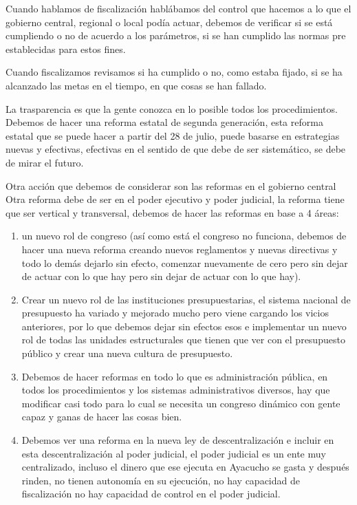 \documentclass[
  letterpaper,
  DIV=11,
  numbers=noendperiod]{scrartcl}
\begin{document}
Cuando hablamos de fiscalización hablábamos del control que hacemos a lo
que el gobierno central, regional o local podía actuar, debemos de
verificar si se está cumpliendo o no de acuerdo a los parámetros, si se
han cumplido las normas pre establecidas para estos fines.

Cuando fiscalizamos revisamos si ha cumplido o no, como estaba fijado,
si se ha alcanzado las metas en el tiempo, en que cosas se han fallado.

La trasparencia es que la gente conozca en lo posible todos los
procedimientos. Debemos de hacer una reforma estatal de segunda
generación, esta reforma estatal que se puede hacer a partir del 28 de
julio, puede basarse en estrategias nuevas y efectivas, efectivas en el
sentido de que debe de ser sistemático, se debe de mirar el futuro.

Otra acción que debemos de considerar son las reformas en el gobierno
central Otra reforma debe de ser en el poder ejecutivo y poder judicial,
la reforma tiene que ser vertical y transversal, debemos de hacer las
reformas en base a 4 áreas:

\begin{enumerate}
\def\labelenumi{\arabic{enumi}.}
\item
  un nuevo rol de congreso (así como está el congreso no funciona,
  debemos de hacer una nueva reforma creando nuevos reglamentos y nuevas
  directivas y todo lo demás dejarlo sin efecto, comenzar nuevamente de
  cero pero sin dejar de actuar con lo que hay pero sin dejar de actuar
  con lo que hay).
\item
  Crear un nuevo rol de las instituciones presupuestarias, el sistema
  nacional de presupuesto ha variado y mejorado mucho pero viene
  cargando los vicios anteriores, por lo que debemos dejar sin efectos
  esos e implementar un nuevo rol de todas las unidades estructurales
  que tienen que ver con el presupuesto público y crear una nueva
  cultura de presupuesto.
\item
  Debemos de hacer reformas en todo lo que es administración pública, en
  todos los procedimientos y los sistemas administrativos diversos, hay
  que modificar casi todo para lo cual se necesita un congreso dinámico
  con gente capaz y ganas de hacer las cosas bien.
\item
  Debemos ver una reforma en la nueva ley de descentralización e incluir
  en esta descentralización al poder judicial, el poder judicial es un
  ente muy centralizado, incluso el dinero que ese ejecuta en Ayacucho
  se gasta y después rinden, no tienen autonomía en su ejecución, no hay
  capacidad de fiscalización no hay capacidad de control en el poder
  judicial.
\end{enumerate}
\end{document}
